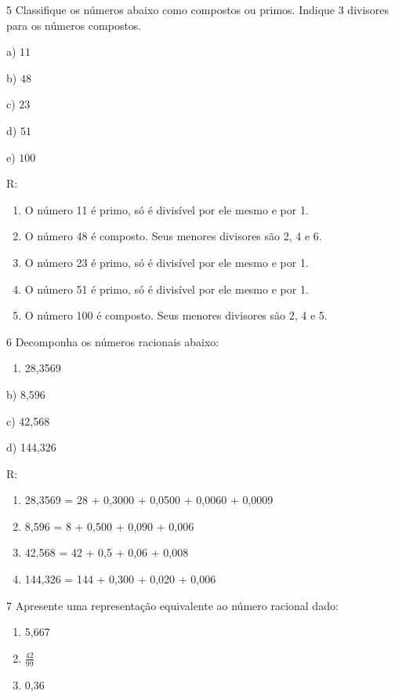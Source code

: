 \num{5} Classifique os números abaixo como compostos ou primos. Indique 3
divisores para os números compostos.

a) $11$

b) $48$

c) $23$

d) $51$

e) $100$

R:

\begin{enumerate}
\def\labelenumi{\alph{enumi})}
\item
  O número 11 é primo, só é divisível por ele mesmo e por 1.
\item
  O número 48 é composto. Seus menores divisores são 2, 4 e 6.
\item
  O número 23 é primo, só é divisível por ele mesmo e por 1.
\item
  O número 51 é primo, só é divisível por ele mesmo e por 1.
\item
  O número 100 é composto. Seus menores divisores são 2, 4 e 5.
\end{enumerate}

\num{6} Decomponha os números racionais abaixo:

\begin{enumerate}
\def\labelenumi{\alph{enumi})}
\tightlist
\item
  28,3569
\end{enumerate}

b) 8,596

c) 42,568

d) 144,326



R:

\begin{enumerate}
\def\labelenumi{\alph{enumi})}
\item
  28,3569 = 28 + 0,3000 + 0,0500 + 0,0060 + 0,0009
\item
  8,596 = 8 + 0,500 + 0,090 + 0,006
\item
  42,568 = 42 + 0,5 + 0,06 + 0,008
\item
  144,326 = 144 + 0,300 + 0,020 + 0,006
\end{enumerate}

\num{7} Apresente uma representação equivalente ao número racional dado:



\begin{enumerate}
\def\labelenumi{\alph{enumi})}
\item
  5,667  
\item
  $\frac{42}{99}$  
\item
  0,36  
\end{enumerate}


